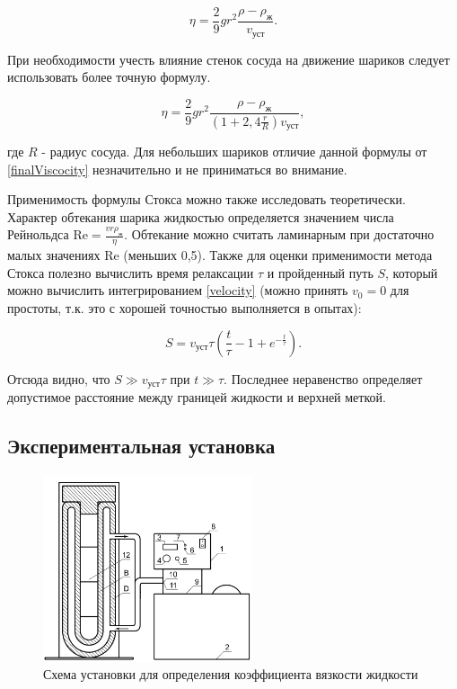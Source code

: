 \documentclass[a4paper,12pt]{article} %
\begin{document}
\begin{equation}
    \eta = \frac{2}{9}gr^2\frac{\rho - \rho_\text{ж}}{v_\text{уст}}.
    \label{finalViscocity}
\end{equation}

При необходимости учесть влияние стенок сосуда на движение шариков следует использовать более точную формулу.

\begin{equation}
    \eta = \frac{2}{9}gr^2\frac{\rho - \rho_\text{ж}}{(1 + 2,4\frac{r}{R})v_\text{уст}},
\end{equation}

где $R$ - радиус сосуда. Для небольших шариков отличие данной формулы от \eqref{finalViscocity} незначительно и не приниматься во внимание.

Применимость формулы Стокса можно также исследовать теоретически. Характер обтекания шарика жидкостью определяется значением числа Рейнольдса $\text{Re} = \frac{vr\rho_\text{ж}}{\eta}$. Обтекание можно считать ламинарным при достаточно малых значениях Re (меньших 0,5). Также для оценки применимости метода Стокса полезно вычислить время релаксации $\tau$ и пройденный путь $S$, который можно вычислить интегрированием \eqref{velocity} (можно принять $v_0 = 0$ для простоты, т.к. это с хорошей точностью выполняется в опытах):

\begin{equation}
    S = v_\text{уст}\tau(\frac{t}{\tau} - 1 + e^{-\frac{t}{\tau}}).
\end{equation}

Отсюда видно, что $S \gg v_\text{уст}\tau$ при $t \gg \tau$. Последнее неравенство определяет допустимое расстояние между границей жидкости и верхней меткой.

\subsection{Экспериментальная установка}

\begin{figure}
    \centering
    \includegraphics[width = 0.55\textwidth]{setup.PNG}
    \caption{Схема установки для определения коэффициента вязкости жидкости}
    \label{fig:setup}
\end{figure}
\end{document}
